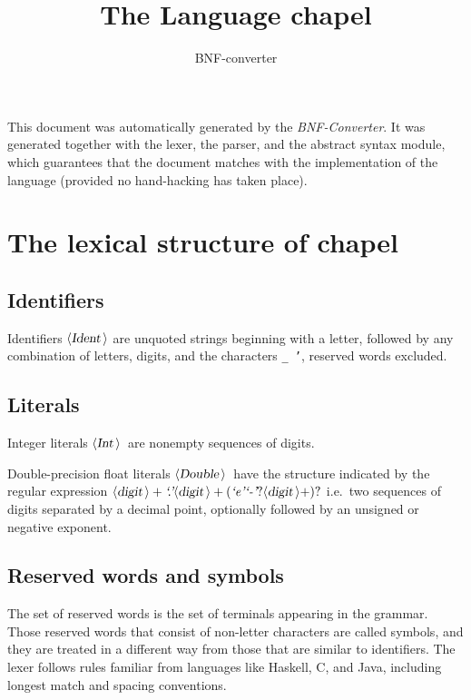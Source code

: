 \documentclass[a4paper,11pt]{article}
\author{BNF-converter}
\title{The Language chapel}
\begin{document}
\maketitle

\newcommand{\emptyP}{\mbox{$\epsilon$}}
\newcommand{\terminal}[1]{\mbox{{\texttt {#1}}}}
\newcommand{\nonterminal}[1]{\mbox{$\langle \mbox{{\sl #1 }} \! \rangle$}}
\newcommand{\arrow}{\mbox{::=}}
\newcommand{\delimit}{\mbox{$|$}}
\newcommand{\reserved}[1]{\mbox{{\texttt {#1}}}}
\newcommand{\literal}[1]{\mbox{{\texttt {#1}}}}
\newcommand{\symb}[1]{\mbox{{\texttt {#1}}}}

This document was automatically generated by the {\em BNF-Converter}. It was generated together with the lexer, the parser, and the abstract syntax module, which guarantees that the document matches with the implementation of the language (provided no hand-hacking has taken place).

\section*{The lexical structure of chapel}
\subsection*{Identifiers}
Identifiers \nonterminal{Ident} are unquoted strings beginning with a letter,
followed by any combination of letters, digits, and the characters {\tt \_ '},
reserved words excluded.


\subsection*{Literals}
Integer literals \nonterminal{Int}\ are nonempty sequences of digits.


Double-precision float literals \nonterminal{Double}\ have the structure
indicated by the regular expression $\nonterminal{digit}+ \mbox{{\it `.'}} \nonterminal{digit}+ (\mbox{{\it `e'}} \mbox{{\it `-'}}? \nonterminal{digit}+)?$ i.e.\
two sequences of digits separated by a decimal point, optionally
followed by an unsigned or negative exponent.




\subsection*{Reserved words and symbols}
The set of reserved words is the set of terminals appearing in the grammar. Those reserved words that consist of non-letter characters are called symbols, and they are treated in a different way from those that are similar to identifiers. The lexer follows rules familiar from languages like Haskell, C, and Java, including longest match and spacing conventions.
\end{document}
